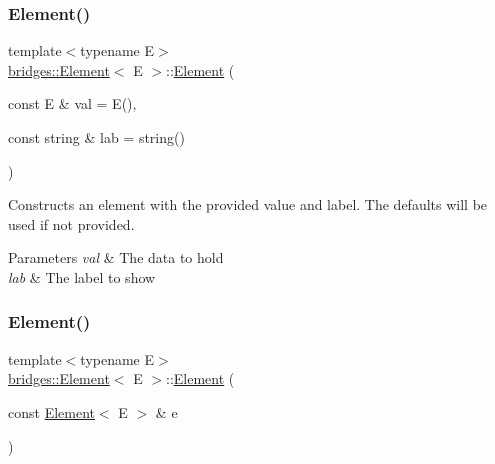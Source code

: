 \subsubsection{\texorpdfstring{Element()}{Element()}\hspace{0.1cm}{\footnotesize\ttfamily [1/2]}}
{\footnotesize\ttfamily template$<$typename E$>$ \\
\mbox{\hyperlink{classbridges_1_1_element}{bridges\+::\+Element}}$<$ E $>$\+::\mbox{\hyperlink{classbridges_1_1_element}{Element}} (\begin{DoxyParamCaption}\item[{const E \&}]{val = {\ttfamily E()},  }\item[{const string \&}]{lab = {\ttfamily string()} }\end{DoxyParamCaption})\hspace{0.3cm}{\ttfamily [inline]}}

Constructs an element with the provided value and label. The defaults will be used if not provided.


\begin{DoxyParams}{Parameters}
{\em val} & The data to hold \\
\hline
{\em lab} & The label to show \\
\hline
\end{DoxyParams}
\mbox{\label{classbridges_1_1_element_a6dc69b51f85f4e9914434b8c79126057}} 
\subsubsection{\texorpdfstring{Element()}{Element()}\hspace{0.1cm}{\footnotesize\ttfamily [2/2]}}
{\footnotesize\ttfamily template$<$typename E$>$ \\
\mbox{\hyperlink{classbridges_1_1_element}{bridges\+::\+Element}}$<$ E $>$\+::\mbox{\hyperlink{classbridges_1_1_element}{Element}} (\begin{DoxyParamCaption}\item[{const \mbox{\hyperlink{classbridges_1_1_element}{Element}}$<$ E $>$ \&}]{e }\end{DoxyParamCaption})\hspace{0.3cm}{\ttfamily [inline]}}

\mbox{\label{classbridges_1_1_element_a1dcdcd8948db683fc109687fe5d9c8e1}} 
